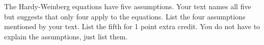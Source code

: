 \documentclass[11pt, addpoints]{exam}
\begin{document}
\begin{questions}

\newpage

\question[4]
The Hardy-Weinberg equations have five assumptions. Your text names all five but suggests that only four apply to the equations. List the four assumptions mentioned by your text. List the fifth for 1 point extra credit. You do not have to explain the assumptions, just list them.

\end{questions}
\end{document}
